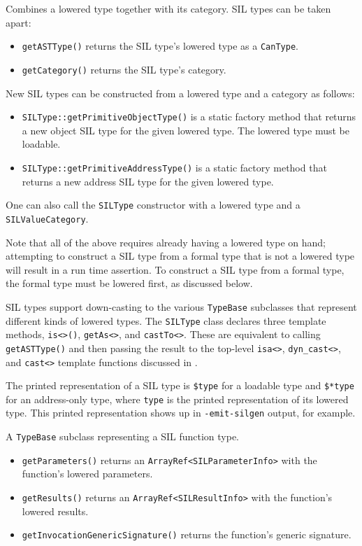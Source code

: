 \documentclass[../generics]{subfiles}
\begin{document}
Combines a lowered type together with its category. SIL types can be taken apart:
\begin{itemize}
\item \texttt{getASTType()} returns the SIL type's lowered type as a \texttt{CanType}.
\item \texttt{getCategory()} returns the SIL type's category.
\end{itemize}
New SIL types can be constructed from a lowered type and a category as follows:
\begin{itemize}
\item \texttt{SILType::getPrimitiveObjectType()} is a static factory method that returns a new object SIL type for the given lowered type. The lowered type must be loadable.
\item \texttt{SILType::getPrimitiveAddressType()} is a static factory method that returns a new address SIL type for the given lowered type.
\end{itemize}
One can also call the \texttt{SILType} constructor with a lowered type and a \texttt{SILValueCategory}.

Note that all of the above requires already having a lowered type on hand; attempting to construct a SIL type from a formal type that is not a lowered type will result in a run time assertion. To construct a SIL type from a formal type, the formal type must be lowered first, as discussed below.

SIL types support down-casting to the various \texttt{TypeBase} subclasses that represent different kinds of lowered types. The \texttt{SILType} class declares three template methods, \verb|is<>()|, \verb|getAs<>|, and \verb|castTo<>|. These are equivalent to calling \texttt{getASTType()} and then passing the result to the top-level \verb|isa<>|, \verb|dyn_cast<>|, and \verb|cast<>| template functions discussed in .

The printed representation of a SIL type is \verb|$type| for a loadable type and \verb|$*type| for an address-only type, where \verb|type| is the printed representation of its lowered type. This printed representation shows up in \verb|-emit-silgen| output, for example.

A \texttt{TypeBase} subclass representing a SIL function type.
\begin{itemize}
\item \texttt{getParameters()} returns an \texttt{ArrayRef<SILParameterInfo>} with the function's lowered parameters.
\item \texttt{getResults()} returns an \texttt{ArrayRef<SILResultInfo>} with the function's lowered results.
\item \texttt{getInvocationGenericSignature()} returns the function's generic signature.
\end{itemize}
\end{document}
